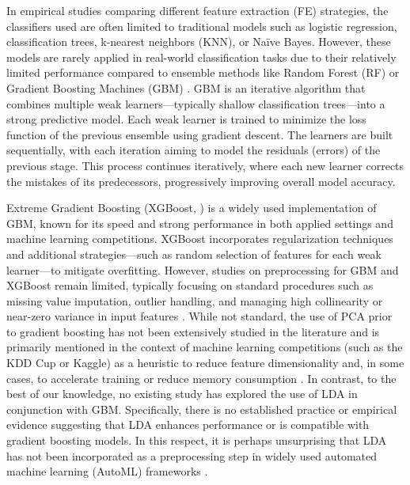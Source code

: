 \documentclass[11pt,a4paper]{article}
\begin{document}
In empirical studies comparing different feature extraction (FE) strategies, the classifiers used are often limited to traditional models such as logistic regression, classification trees, k-nearest neighbors (KNN), or Na\"ive Bayes. However, these models are rarely applied in real-world classification tasks due to their relatively limited performance compared to ensemble methods like Random Forest (RF) or Gradient Boosting Machines (GBM) \citep{fernandez2014we,  chen2016xgboost}.
GBM is an iterative algorithm that combines multiple weak learners---typically shallow classification trees---into a strong predictive model. Each weak learner is trained to minimize the loss function of the previous ensemble using gradient descent. The learners are built sequentially, with each iteration aiming to model the residuals (errors) of the previous stage. This process continues iteratively, where each new learner corrects the mistakes of its predecessors, progressively improving overall model accuracy.

Extreme Gradient Boosting (XGBoost, \cite{chen2016xgboost}) is a widely used implementation of GBM, known for its speed and strong performance in both applied settings and machine learning competitions. XGBoost incorporates regularization techniques and additional strategies---such as random selection of features for each weak learner---to mitigate overfitting.
However, studies on preprocessing for GBM and XGBoost remain limited, typically focusing on standard procedures such as missing value imputation, outlier handling, and managing high collinearity or near-zero variance in input features \citep{gabriel2023optimizing, chen2016xgboost}.
While not standard, the use of PCA prior to gradient boosting has not been extensively studied in the literature and is primarily mentioned in the context of machine learning competitions (such as the KDD Cup or Kaggle) as a heuristic to reduce feature dimensionality and, in some cases, to accelerate training or reduce memory consumption \citep{rakhshan2020tensorized}.
In contrast, to the best of our knowledge, no existing study has explored the use of LDA in conjunction with GBM. Specifically, there is no established practice or empirical evidence suggesting that LDA enhances performance or is compatible with gradient boosting models. In this respect, it is perhaps unsurprising that LDA has not been incorporated as a preprocessing step in widely used automated machine learning (AutoML) frameworks \citep{NIPS2015_11d0e628}.
\end{document}
